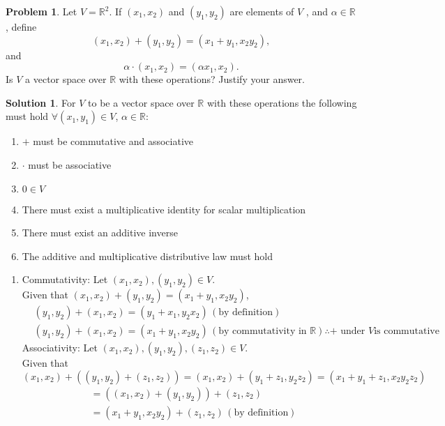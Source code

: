 \documentclass[10pt]{article}
\theoremstyle{definition}
\newtheorem{problem}{Problem}
\newtheorem{soln}{Solution}
\begin{document}
\begin{problem}
Let $V=\mathbb{R}^2$. If $(x_1, x_2)$ and $(y_1, y_2)$ are elements of $V$ , and $\alpha\in\mathbb{R}$, define
$$(x_1, x_2) + (y_1, y_2) = (x_1 + y_1, x_2y_2),$$ and $$\alpha\cdot(x_1, x_2) = (\alpha x_1, x_2).$$
Is $V$ a vector space over $\mathbb{R}$ with these operations? Justify your answer.
\end{problem}
\begin{soln} For $V$ to be a vector space over $\mathbb{R}$ with these operations the following must hold $\forall(x_1,y_1)\in V$, $\alpha\in\mathbb{R}$:
  \begin{enumerate}[label=(\roman*)]
    \item $+$ must be commutative and associative
    \item $\cdot$ must be associative
    \item $0\in V$
    \item There must exist a multiplicative identity for scalar multiplication
    \item There must exist an additive inverse
    \item The additive and multiplicative distributive law must hold
  \end{enumerate}
  \begin{enumerate}[label=(\roman*)]
    \item Commutativity: Let $(x_1, x_2), (y_1, y_2)\in V$. \\
          Given that $(x_1, x_2) + (y_1, y_2) = (x_1 + y_1, x_2y_2)$,
          \begin{align*}
             & (y_1, y_2) + (x_1, x_2) = (y_1 + x_1, y_2x_2) \, (\text{by definition})                                                                       \\
             & (y_1, y_2) + (x_1, x_2) = (x_1 + y_1, x_2y_2) \, (\text{by commutativity in } \mathbb{R}) \therefore + \text{ under } V \text{is commutative}
          \end{align*}
          Associativity: Let $(x_1, x_2), (y_1, y_2), (z_1, z_2)\in V$. \\
          Given that $(x_1, x_2) + ((y_1, y_2) + (z_1, z_2)) = (x_1, x_2) + (y_1 + z_1, y_2z_2) =(x_1 + y_1 + z_1, x_2y_2z_2)$
          \begin{align*}
             & =((x_1, x_2) + (y_1, y_2)) + (z_1, z_2)                                                                                        \\
             & =(x_1 + y_1, x_2y_2) + (z_1, z_2) \, (\text{by definition})                                                                    \\

\end{align*}
\end{enumerate}
\end{soln}
\end{document}
